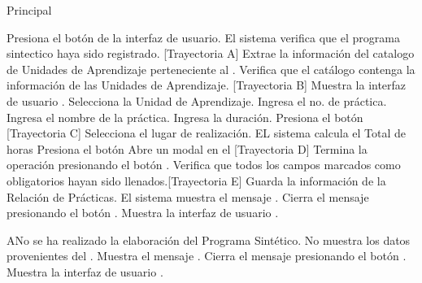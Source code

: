 \begin{UCtrayectoria}{Principal}

    \UCpaso[\UCactor] Presiona el botón  de la interfaz de usuario. 
    \UCpaso El sistema verifica que el programa sintectico haya sido registrado. [Trayectoria A]
    \UCpaso Extrae la información del catalogo de Unidades de Aprendizaje perteneciente al . 
    \UCpaso Verifica que el catálogo contenga la información de las Unidades de Aprendizaje. [Trayectoria B]
    \UCpaso Muestra la interfaz de usuario .
    \UCpaso[\UCactor] Selecciona la Unidad de Aprendizaje.
    \UCpaso[\UCactor] Ingresa el no. de práctica.
    \UCpaso[\UCactor] Ingresa el nombre de la práctica.
    \UCpaso[\UCactor] Ingresa la duración.
    \UCpaso[\UCactor] Presiona el botón  [Trayectoria C]
    \UCpaso[\UCactor] Selecciona el lugar de realización.
    \UCpaso EL sistema calcula el Total de horas %
    \UCpaso[\UCactor] Presiona el botón 
    \UCpaso Abre un modal en el  [Trayectoria D]
    \UCpaso[\UCactor] Termina la operación presionando el botón . 
    \UCpaso Verifica que todos los campos marcados como obligatorios hayan sido llenados.[Trayectoria E]
    \UCpaso Guarda la información de la Relación de Prácticas.
    \UCpaso El sistema muestra el mensaje .
    \UCpaso[\UCactor] Cierra el mensaje presionando el botón .
    \UCpaso Muestra la interfaz de usuario .
\end{UCtrayectoria}


\begin{UCtrayectoriaA}{A}{No se ha realizado la elaboración del Programa Sintético.}
	\UCpaso No muestra los datos provenientes del .
	\UCpaso Muestra el mensaje .
	\UCpaso[\UCactor] Cierra el mensaje presionando el botón .
	\UCpaso Muestra la interfaz de usuario .
\end{UCtrayectoriaA}

